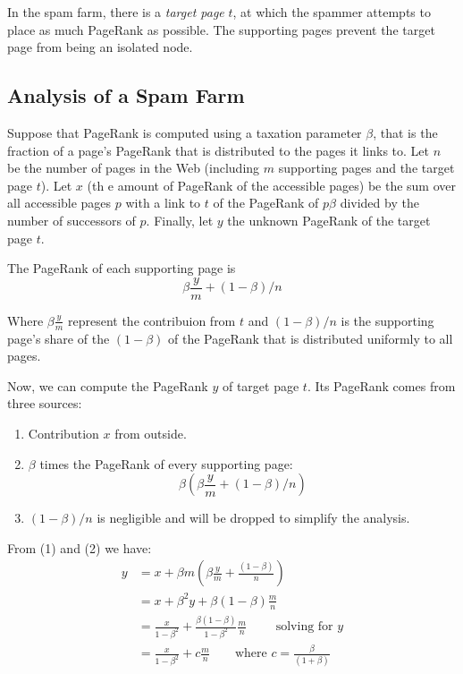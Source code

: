 In the spam farm, there is a \textit{target page} $t$, at which the spammer attempts to place as much PageRank as possible. The supporting pages prevent the target page from being an isolated node.

\subsection{Analysis of a Spam Farm}\label{subsec:analysis-spam-farm}

Suppose that PageRank is computed using a taxation parameter $\beta$, that is the fraction of a page's PageRank that is distributed to the pages it links to. Let $n$ be the number of pages in the Web (including $m$ supporting pages and the target page $t$). Let $x$ (th e amount of PageRank of the accessible pages) be the sum over all accessible pages $p$ with a link to $t$ of the PageRank of $p \beta$ divided by the number of successors of $p$. Finally, let $y$ the unknown PageRank of the target page $t$.

The PageRank of each supporting page is
\begin{equation*}
    \beta \frac{y}{m} + (1 - \beta) / n
\end{equation*}

Where $\beta \frac{y}{m}$  represent the contribuion from $t$ and $(1 - \beta) / n$ is the supporting page's share of the $(1 - \beta)$ of the PageRank that is distributed uniformly to all pages.

Now, we can compute the PageRank $y$ of target page $t$. Its PageRank comes from three sources:
\begin{enumerate}
    \item Contribution $x$ from outside.
    \item $\beta$ times the PageRank of every supporting page:
    \begin{equation*}
        \beta \left(\beta \frac{y}{m} + (1 - \beta) / n\right)
    \end{equation*}
    \item $(1 - \beta)/n$ is negligible and will be dropped to simplify the analysis.
\end{enumerate}

\noindent From (1) and (2) we have:
\begin{equation*}
    \begin{split}
        y & = x + \beta m \left(\beta \frac{y}{m} + \frac{(1 - \beta)}{n}\right) \\
          & = x + \beta^2 y + \beta (1 - \beta) \frac{m}{n}\\
          & = \frac{x}{1 - \beta^2} + \frac{\beta (1 - \beta)}{1 - \beta^2} \frac{m}{n} \qquad \text{ solving for } y \\
          & = \frac{x}{1 - \beta^2} + c \frac{m}{n} \qquad \text{where } c = \frac{\beta}{(1 + \beta)}   
\end{split}
\end{equation*}

